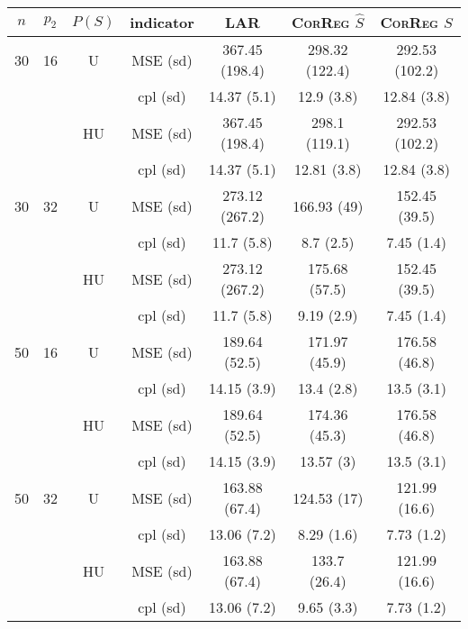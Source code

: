 \documentclass[11pt,a4paper]{article}
\begin{document}
\begin{table}[h!]
\centering
\begin{tabular}{|c|c|c|c|c|c|c|}
\hline 
$n$ & $p_2$&  $P(S)$ &indicator &LAR  &    \textsc{CorReg} $\hat S$& \textsc{CorReg} $S$\\ 
\hline %
30 & 16 & U&MSE (sd) & 367.45 (198.4) & 298.32 (122.4) & 292.53 (102.2) \\
& & & cpl (sd) & 14.37 (5.1) & 12.9 (3.8) & 12.84 (3.8) \\
 &  &HU &MSE (sd) & 367.45 (198.4) & 298.1 (119.1) & 292.53 (102.2) \\
& & & cpl (sd) & 14.37 (5.1) & 12.81 (3.8) & 12.84 (3.8) \\
\hline %
30 & 32 & U & MSE (sd) & 273.12 (267.2) & 166.93 (49) & 152.45 (39.5) \\
& & & cpl (sd) & 11.7 (5.8) & 8.7 (2.5) & 7.45 (1.4) \\
 &  & HU & MSE (sd) & 273.12 (267.2) & 175.68 (57.5) & 152.45 (39.5) \\
& & & cpl (sd) & 11.7 (5.8) & 9.19 (2.9) & 7.45 (1.4) \\
\hline
\hline %
50 & 16 & U&	MSE (sd) & 189.64 (52.5) & 171.97 (45.9) & 176.58 (46.8) \\
& & & cpl (sd) & 14.15 (3.9) & 13.4 (2.8) & 13.5 (3.1) \\
 &  &HU &MSE (sd) & 189.64 (52.5) & 174.36 (45.3) & 176.58 (46.8) \\
& & & cpl (sd) & 14.15 (3.9) & 13.57 (3) & 13.5 (3.1) \\
\hline %
50 & 32 & U&MSE (sd) & 163.88 (67.4) & 124.53 (17) & 121.99 (16.6) \\
& & & cpl (sd) & 13.06 (7.2) & 8.29 (1.6) & 7.73 (1.2) \\
 &  &HU &MSE (sd) & 163.88 (67.4) & 133.7 (26.4) & 121.99 (16.6) \\
& & &cpl (sd) & 13.06 (7.2) & 9.65 (3.3) & 7.73 (1.2) \\

\end{tabular}
\end{table}
\end{document}
